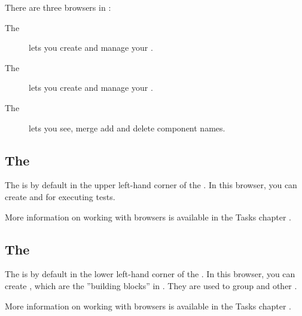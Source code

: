 
There are three browsers in \app{}:
\begin{description}
\item[The \gdtestcasebrowser{}]{ lets you create and manage your \gdcases{}. }
\item[The \gdtestsuitebrowser{}]{ lets you create and manage your \gdsuites{}.}
\item [The \gdcompnamebrowser{}]{lets you see, merge add and delete component names.}
\end{description}

\subsection{The \gdtestsuitebrowser{}}
The \gdtestsuitebrowser{} is by default in the upper left-hand corner of the \specpersp{}. In this browser, you can create \gdsuites{} and \gdjobs{} for executing tests. 

More information on working with browsers is available in the Tasks chapter .


\subsection{The \gdtestcasebrowser{}}

The \gdtestcasebrowser{} is by default in the lower left-hand corner of the \specpersp{}. In this browser, you can create \gdcases{}, which are the ''building blocks'' in \app{}. They are used to group \gdsteps{} and other \gdcases{}.  

More information on working with browsers is available in the Tasks chapter .


